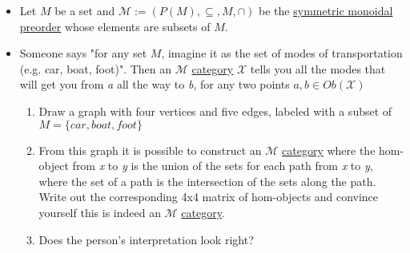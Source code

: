\begin{itemize}
    \item Let $M$ be a set and $\mathcal{M}:=(P(M),\subseteq, M, \cap)$ be the \href{doc/1 math/Seven Sketches in Compositionality/Chapter 2: Resource theories/2 Symmetric monoidal preorders/1 Definition and first examples/1 Symmetric monoidal structure on a preorder}{symmetric monoidal preorder} whose elements are subsets of $M$.
    \item Someone says "for any set $M$, imagine it as the set of modes of transportation (e.g. car, boat, foot)". Then an $\mathcal{M}$ \href{doc/1 math/Seven Sketches in Compositionality/Chapter 2: Resource theories/3 Enrichment/1 V-categories/1 V-category}{category} $\mathcal{X}$ tells you all the modes that will get you from \emph{a} all the way to \emph{b}, for any two points $a,b \in Ob(\mathcal{X})$
          \begin{enumerate}
            \item Draw a graph with four vertices and five edges, labeled with a subset of $M=\{car,boat,foot\}$
            \item From this graph it is possible to construct an $\mathcal{M}$ \href{doc/1 math/Seven Sketches in Compositionality/Chapter 2: Resource theories/3 Enrichment/1 V-categories/1 V-category}{category} where the hom-object from \emph{x} to \emph{y} is the union of the sets for each path from \emph{x} to \emph{y}, where the set of a path is the intersection of the sets along the path. Write out the corresponding 4x4 matrix of hom-objects and convince yourself this is indeed an $\mathcal{M}$ \href{doc/1 math/Seven Sketches in Compositionality/Chapter 2: Resource theories/3 Enrichment/1 V-categories/1 V-category}{category}.
            \item Does the person's interpretation look right?
          \end{enumerate}
  \end{itemize}